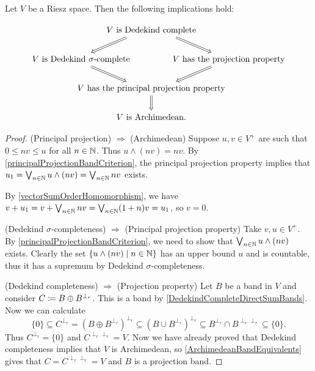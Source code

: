 \begin{proposition} \label{DedekindCompleteProjectionPropertieArchimedean}
Let $V$ be a Riesz space. Then the following implications hold:

\[ \begin{tikzcd}[column sep=0]
& \text{$V$ is Dedekind complete} \ar[dl, Rightarrow, end anchor={[xshift=2em]north east}] \ar[dr, Rightarrow, end anchor={[xshift = -2em]north west}] & \\
\text{$V$ is Dedekind $\sigma$-complete} \hspace{-7em} \ar[dr, Rightarrow, start anchor={[xshift=2em]south east}] && \hspace{-7em} \text{$V$ has the projection property} \ar[dl, Rightarrow, start anchor={[xshift=-2em]south west}] \\
& \text{$V$ has the principal projection property} \ar[d, Rightarrow] & \\
& \text{$V$ is Archimedean.} &
\end{tikzcd} \]
\end{proposition}
\begin{proof}
(Principal projection) $\Rightarrow$ (Archimedean) Suppose $u,v\in V^+$ are such that $0\leq nv \leq u$ for all $n\in \mathbb{N}$. Thus $u\wedge (nv) = nv$. By \ref{principalProjectionBandCriterion}, the principal projection property implies that $u_1 = \bigvee_{n\in \mathbb{N}} u\wedge (nv) = \bigvee_{n\in \mathbb{N}}nv$ exists.

By \ref{vectorSumOrderHomomorphism}, we have $v+ u_1 = v+\bigvee_{n\in \mathbb{N}}nv = \bigvee_{n\in \mathbb{N}}(1+n)v = u_1$, so $v = 0$.

(Dedekind $\sigma$-completeness) $\Rightarrow$ (Principal projection property) Take $v, u\in V^+$. By \ref{principalProjectionBandCriterion}, we need to show that $\bigvee_{n\in\mathbb{N}}u\wedge (nv)$ exists. Clearly the set $\setbuilder{u\wedge (nv)}{n\in \N}$ has an upper bound $u$ and is countable, thus it has a supremum by Dedekind $\sigma$-completeness.

(Dedekind completeness) $\Rightarrow$ (Projection property) Let $B$ be a band in $V$ and consider $C \coloneqq B \oplus B^{\perp_r}$. This is a band by \ref{DedekindCompleteDirectSumBands}. Now we can calculate
\[ \{0\} \subseteq C^{\perp_r} = (B\oplus B^{\perp_r})^{\perp_r} \subseteq (B\cup B^{\perp_r})^{\perp_r} \subseteq B^{\perp_r} \cap B^{\perp_r\perp_r} \subseteq \{0\}. \]
Thus $C^{\perp_r} = \{0\}$ and $C^{\perp_r\perp_r} = V$. Now we have already proved that Dedekind completeness implies that $V$ is Archimedean, so \ref{ArchimedeanBandEquivalents} gives that $C= C^{\perp_r\perp_r} = V$ and $B$ is a projection band.
\end{proof}

